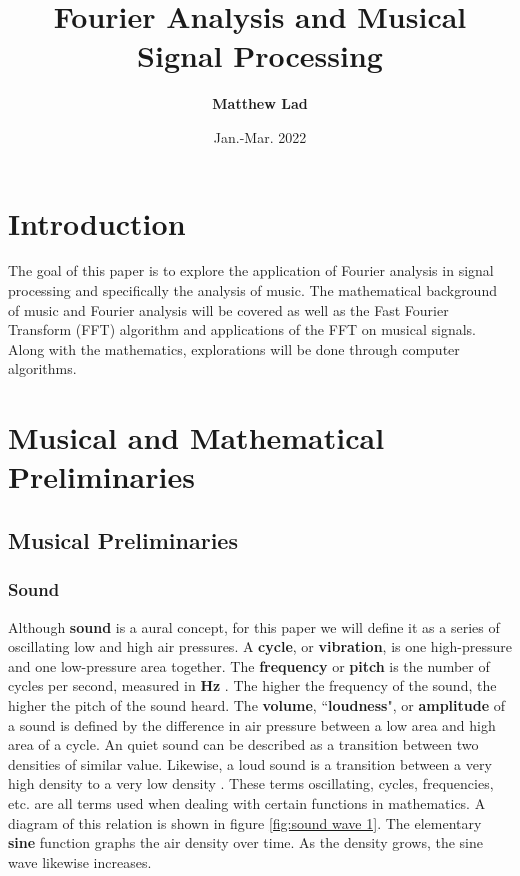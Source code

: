\documentclass[10pt]{article}
\title{
    \textbf{Fourier Analysis and Musical Signal Processing}}
\author{\textbf{Matthew Lad}}
\date{Jan.-Mar. 2022}
\begin{document}
 
\maketitle

\section{Introduction}
\hspace{\parindent} The goal of this paper is to explore the application of Fourier analysis in signal processing and specifically the analysis of music. The mathematical background of music and Fourier analysis will be covered as well as the Fast Fourier Transform (FFT) algorithm and applications of the FFT on musical signals. Along with the mathematics, explorations will be done through computer algorithms.

\section{Musical and Mathematical Preliminaries}

\subsection{Musical Preliminaries}
\subsubsection{Sound}
\hspace{\parindent}Although \textbf{sound} is a aural concept, for this paper we will define it as a series of oscillating low and high air pressures. A \textbf{cycle}, or \textbf{vibration}, is one high-pressure and one low-pressure area together. The \textbf{frequency} or \textbf{pitch} is the number of cycles per second, measured in \textbf{Hz} \cite{hertzDefinition}. The higher the frequency of the sound, the higher the pitch of the sound heard. The \textbf{volume}, \textquotedblleft\textbf{loudness}", or \textbf{amplitude} of a sound is defined by the difference in air pressure between a low area and high area of a cycle. An quiet sound can be described as a transition between two densities of similar value. Likewise, a loud sound is a transition between a very high density to a very low density \cite{boatwright1956musictheory} \cite{lenssen2014fouriermusic}. These terms oscillating, cycles, frequencies, etc. are all terms used when dealing with certain functions in mathematics. A diagram of this relation is shown in figure \ref{fig:sound wave 1}. The elementary \textbf{sine} function graphs the air density over time. As the density grows, the sine wave likewise increases.
\end{document}
